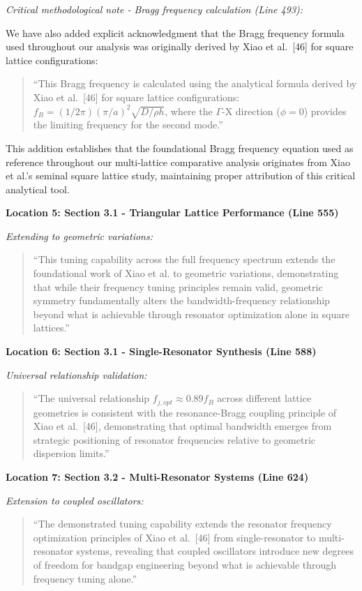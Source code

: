 \documentclass[11pt,a4paper]{article}
\newenvironment{changesbox}{%
    \par\medskip\noindent{\color{changescolor}\rule{\linewidth}{2pt}}\par
    \noindent{\color{changescolor}\bfseries Manuscript Changes}\par\smallskip
}{%
    \par\noindent{\color{changescolor}\rule{\linewidth}{0.5pt}}\medskip
}
\begin{document}
\begin{changesbox}
\textit{Critical methodological note - Bragg frequency calculation (Line 493):}

We have also added explicit acknowledgment that the Bragg frequency formula used throughout our analysis was originally derived by Xiao et al.~[46] for square lattice configurations:
\begin{quote}
\textcolor{redtext}{``This Bragg frequency is calculated using the analytical formula derived by Xiao et al.~[46] for square lattice configurations: $f_B = (1/2\pi)(\pi/a)^2\sqrt{D/\rho h}$, where the $\Gamma$-X direction ($\phi = 0$) provides the limiting frequency for the second mode.''}
\end{quote}

This addition establishes that the foundational Bragg frequency equation used as reference throughout our multi-lattice comparative analysis originates from Xiao et al.'s seminal square lattice study, maintaining proper attribution of this critical analytical tool.

\textbf{Location 5: Section 3.1 - Triangular Lattice Performance (Line 555)}

\textit{Extending to geometric variations:}
\begin{quote}
\textcolor{redtext}{``This tuning capability across the full frequency spectrum extends the foundational work of Xiao et al. to geometric variations, demonstrating that while their frequency tuning principles remain valid, geometric symmetry fundamentally alters the bandwidth-frequency relationship beyond what is achievable through resonator optimization alone in square lattices.''}
\end{quote}

\textbf{Location 6: Section 3.1 - Single-Resonator Synthesis (Line 588)}

\textit{Universal relationship validation:}
\begin{quote}
\textcolor{redtext}{``The universal relationship $f_{j,opt} \approx 0.89 f_B$ across different lattice geometries is consistent with the resonance-Bragg coupling principle of Xiao et al.~[46], demonstrating that optimal bandwidth emerges from strategic positioning of resonator frequencies relative to geometric dispersion limits.''}
\end{quote}

\textbf{Location 7: Section 3.2 - Multi-Resonator Systems (Line 624)}

\textit{Extension to coupled oscillators:}
\begin{quote}
\textcolor{redtext}{``The demonstrated tuning capability extends the resonator frequency optimization principles of Xiao et al.~[46] from single-resonator to multi-resonator systems, revealing that coupled oscillators introduce new degrees of freedom for bandgap engineering beyond what is achievable through frequency tuning alone.''}
\end{quote}


\end{changesbox}
\end{document}
